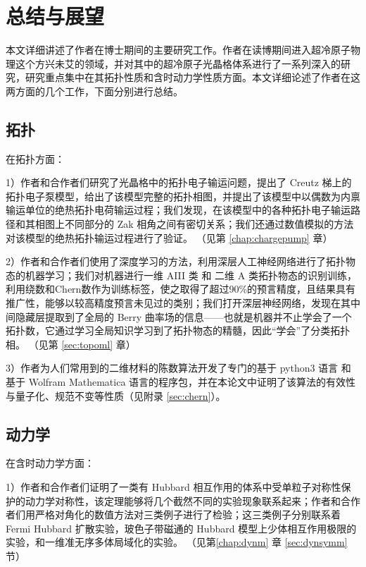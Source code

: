 \chapter{总结与展望}

本文详细讲述了作者在博士期间的主要研究工作。作者在读博期间进入超冷原子物理这个方兴未艾的领域，并对其中的超冷原子光晶格体系进行了一系列深入的研究，研究重点集中在其拓扑性质和含时动力学性质方面。本文详细论述了作者在这两方面的几个工作，下面分别进行总结。


\section{拓扑}

在拓扑方面：

1）作者和合作者们研究了光晶格中的拓扑电子输运问题，提出了 Creutz 梯上的拓扑电子泵模型，给出了该模型完整的拓扑相图，并提出了该模型中以偶数为内禀输运单位的绝热拓扑电荷输运过程；我们发现，在该模型中的各种拓扑电子输运路径和其相图上不同部分的 Zak 相角之间有密切关系；我们还通过数值模拟的方法对该模型的绝热拓扑输运过程进行了验证。
（见第 \ref{chap:chargepump} 章）

2）作者和合作者们使用了深度学习的方法，利用深层人工神经网络进行了拓扑物态的机器学习；我们对机器进行一维 AIII 类 和 二维 A 类拓扑物态的识别训练，利用绕数和Chern数作为训练标签，使之取得了超过90\%的预言精度，且结果具有推广性，能够以较高精度预言未见过的类别；我们打开深层神经网络，发现在其中间隐藏层提取到了全局的 Berry 曲率场的信息——也就是机器并不止学会了一个拓扑数，它通过学习全局知识学习到了拓扑物态的精髓，因此“学会”了分类拓扑相。
（见第 \ref{sec:topoml} 章）

3）作者为人们常用到的二维材料的陈数算法\cite{chern2005}开发了专门的基于 python3 语言 和 基于 Wolfram Mathematica 语言的程序包，并在本论文中证明了该算法的有效性与量子化、规范不变等性质（见附录 \ref{sec:chern}）。





\section{动力学}

在含时动力学方面：

1）作者和合作者们证明了一类有 Hubbard 相互作用的体系中受单粒子对称性保护的动力学对称性，该定理能够将几个截然不同的实验现象\cite{hubbard-expan-2010,hubbard-expan-2012,mbl1d,twobody-2017}联系起来；作者和合作者们用严格对角化的数值方法对三类例子进行了检验；这三类例子分别联系着 Fermi Hubbard 扩散实验，玻色子带磁通的 Hubbard 模型上少体相互作用极限的实验，和一维准无序多体局域化的实验。
（见第\ref{chap:dynm} 章 \ref{sec:dynsymm} 节）

